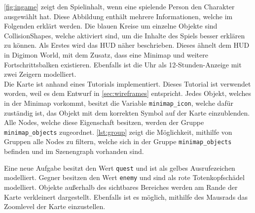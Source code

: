 \autoref{fig:ingame} zeigt den Spielinhalt, wenn eine spielende Person den Charakter ausgewählt hat.
Diese Abbildung enthält mehrere Informationen, welche im Folgenden erklärt werden.
Die blauen Kreise um einzelne Objekte sind CollisionShapes, welche aktiviert sind, um die Inhalte des Spiels besser erklären zu können.
Als Erstes wird das \ac{HUD} näher beschrieben.
Dieses ähnelt dem \ac{HUD} in Digimon World, mit dem Zusatz, dass eine Minimap und weitere Fortschrittsbalken existieren.
Ebenfalls ist die Uhr als 12-Stunden-Anzeige mit zwei Zeigern modelliert.\\

Die Karte ist anhand eines Tutorials implementiert\cite{kids-minimap}.
Dieses Tutorial ist verwendet worden, weil es dem Entwurf in \autoref{sec:wireframes} entspricht.
Jedes Objekt, welches in der Minimap vorkommt, besitzt die Variable \texttt{minimap\_icon}, welche dafür zuständig ist, das Objekt mit dem korrekten Symbol auf der Karte einzublenden.
Alle Nodes, welche diese Eigenschaft besitzen, werden der Gruppe \texttt{minimap\_objects} zugeordnet.
\autoref{lst:group} zeigt die Möglichkeit, mithilfe von Gruppen alle Nodes zu filtern, welche sich in der Gruppe \texttt{minimap\_objects} befinden und im Szenengraph vorhanden sind.\\


Eine neue Aufgabe besitzt den Wert \texttt{quest} und ist als gelbes Ausrufezeichen modelliert.
Gegner besitzen den Wert \texttt{enemy} und sind als rote Totenkopfschädel modelliert.
Objekte außerhalb des sichtbares Bereiches werden am Rande der Karte verkleinert dargestellt.
Ebenfalls ist es möglich, mithilfe des Mausrads das Zoomlevel der Karte einzustellen. \\

